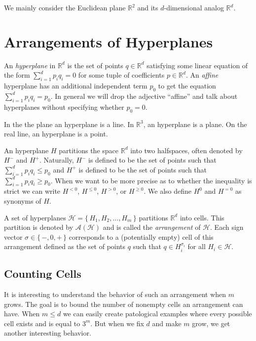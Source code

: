 We mainly consider the Euclidean plane \(\mathbb{R}^2\) and its
\(d\)-dimensional analog \(\mathbb{R}^d\).

\chapter{Arrangements of Hyperplanes}

An \emph{hyperplane} in \(\mathbb{R}^d\) is the set of points \(q \in \mathbb{R}^d\)
satisfying some linear equation of the form \(\sum_{i=1}^{d} p_i q_i = 0\) for
some tuple of coefficients \(p \in \mathbb{R}^d\). An \emph{affine} hyperplane has an
additional independent term \(p_0\) to get the equation \(\sum_{i=1}^{d}
p_i q_i = p_0\). In general we will drop the adjective ``affine'' and talk about
hyperplanes without specifying whether \(p_0 = 0\).

In the the plane an hyperplane is a line. In \(\mathbb{R}^3\), an hyperplane is
a plane. On the real line, an hyperplane is a point.

An hyperplane \(H\) partitions the space \(\mathbb{R}^d\) into two halfspaces,
often denoted by \(H^-\) and \(H^+\).
Naturally, \(H^-\) is defined to be the set of points such that
\(\sum_{i=1}^{d} p_i q_i \leq p_0 \) and \(H^+\) is defined to be the set of
points such that \(\sum_{i=1}^{d} p_i q_i \geq p_0 \). When we want to be more
precise as to whether the inequality is strict we can write \(H^{<0}\),
\(H^{\leq 0}\), \(H^{>0}\), or \(H^{\geq 0}\).
We also define \(H^0\) and \(H^{=0}\) as synonyms of \(H\).

A set of hyperplanes \(\mathcal{H} = \{\, H_1, H_2, \ldots, H_m\,\}\)
partitions \(\mathbb{R}^d\) into cells.
%
This partition is denoted by \(\mathcal{A}(\mathcal{H})\) and is called the
\emph{arrangement} of \(\mathcal{H}\).
%
Each sign vector \(\sigma \in \{\,
-,0,+\,\}\) corresponds to a (potentially empty) cell of this arrangement
defined as the set of points \(q\) such that \(q \in H_i^{\sigma_i}\) for all
\(H_i \in \mathcal{H}\).

\section{Counting Cells}
It is interesting to understand the behavior of such an arrangement when
\(m\) grows. The goal is to bound the number of nonempty cells an arrangement
can have. When \(m \leq d\) we can easily create patological examples where
every possible cell exists and is equal to \(3^m\). But when we fix
\(d\) and make \(m\) grow, we get another interesting behavior.

